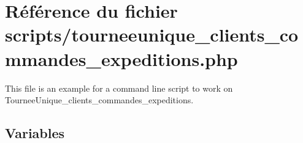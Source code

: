 \hypertarget{tourneeunique__clients__commandes__expeditions_8php}{}\section{Référence du fichier scripts/tourneeunique\+\_\+clients\+\_\+commandes\+\_\+expeditions.php}
\label{tourneeunique__clients__commandes__expeditions_8php}


This file is an example for a command line script to work on Tournee\+Unique\+\_\+clients\+\_\+commandes\+\_\+expeditions.  


\subsection*{Variables}
